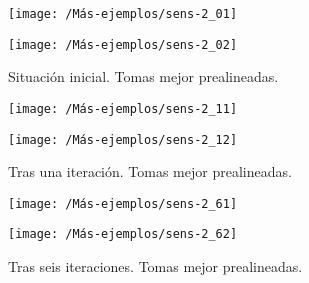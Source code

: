 \begin{figure}[h!]	
	\begin{minipage}{0.5\textwidth}
		\centering		
		\texttt{[image: /Más-ejemplos/sens-2\_01]} 
	\end{minipage}
	\begin{minipage}{0.5\textwidth}
		\centering
		\texttt{[image: /Más-ejemplos/sens-2\_02]}
	\end{minipage}	
	\caption{Situación inicial. Tomas mejor prealineadas.}
	\label{fig:sensi3-1}
\end{figure}
\begin{figure}[h!]	
	\begin{minipage}{0.5\textwidth}
		\centering		
		\texttt{[image: /Más-ejemplos/sens-2\_11]} 
	\end{minipage}
	\begin{minipage}{0.5\textwidth}
		\centering
		\texttt{[image: /Más-ejemplos/sens-2\_12]}
	\end{minipage}	
	\caption{Tras una iteración. Tomas mejor prealineadas.}
	\label{fig:sensi3-2}
\end{figure}
\begin{figure}[h!]	
	\begin{minipage}{0.5\textwidth}
		\centering		
		\texttt{[image: /Más-ejemplos/sens-2\_61]} 
	\end{minipage}
	\begin{minipage}{0.5\textwidth}
		\centering
		\texttt{[image: /Más-ejemplos/sens-2\_62]}
	\end{minipage}	
	\caption{Tras seis iteraciones. Tomas mejor prealineadas.}
	\label{fig:sensi3-3}
\end{figure}


